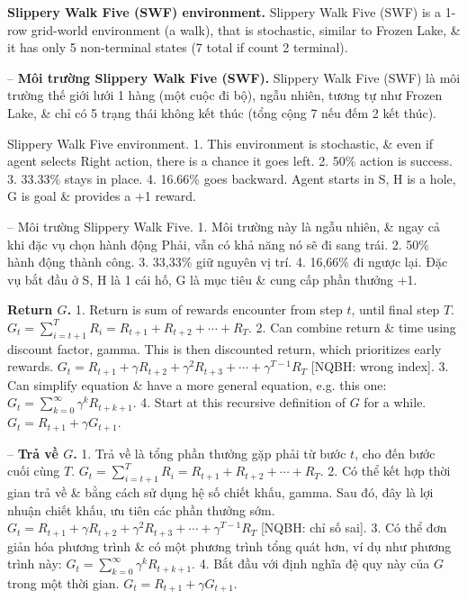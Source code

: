 \documentclass{article}
\begin{document}
\begin{itemize}
\begin{itemize}
        {\bf Slippery Walk Five (SWF) environment.} Slippery Walk Five (SWF) is a 1-row grid-world environment (a walk), that is stochastic, similar to Frozen Lake, \& it has only 5 non-terminal states (7 total if count 2 terminal).

        -- {\bf Môi trường Slippery Walk Five (SWF).} Slippery Walk Five (SWF) là môi trường thế giới lưới 1 hàng (một cuộc đi bộ), ngẫu nhiên, tương tự như Frozen Lake, \& chỉ có 5 trạng thái không kết thúc (tổng cộng 7 nếu đếm 2 kết thúc).

        {\sf Slippery Walk Five environment.} 1. This environment is stochastic, \& even if agent selects Right action, there is a chance it goes left. 2. 50\% action is success. 3. 33.33\% stays in place. 4. 16.66\% goes backward. Agent starts in S, H is a hole, G is goal \& provides a +1 reward.

        -- {\sf Môi trường Slippery Walk Five.} 1. Môi trường này là ngẫu nhiên, \& ngay cả khi đặc vụ chọn hành động Phải, vẫn có khả năng nó sẽ đi sang trái. 2. 50\% hành động thành công. 3. 33,33\% giữ nguyên vị trí. 4. 16,66\% đi ngược lại. Đặc vụ bắt đầu ở S, H là 1 cái hố, G là mục tiêu \& cung cấp phần thưởng +1.

        {\bf Return $G$.} 1. Return is sum of rewards encounter from step $t$, until final step $T$. $G_t = \sum_{i=t+1}^T R_i = R_{t+1} + R_{t+2} + \cdots + R_T$. 2. Can combine return \& time using discount factor, gamma. This is then discounted return, which prioritizes early rewards. $G_t = R_{t+1} + \gamma R_{t+2} + \gamma^2R_{t+3} + \cdots + \gamma^{T-1}R_T$ [NQBH: wrong index]. 3. Can simplify equation \& have a more general equation, e.g. this one: $G_t = \sum_{k=0}^\infty \gamma^kR_{t + k + 1}$. 4. Start at this recursive definition of $G$ for a while. $G_t = R_{t+1} + \gamma G_{t+1}$.

        -- {\bf Trả về $G$.} 1. Trả về là tổng phần thưởng gặp phải từ bước $t$, cho đến bước cuối cùng $T$. $G_t = \sum_{i=t+1}^T R_i = R_{t+1} + R_{t+2} + \cdots + R_T$. 2. Có thể kết hợp thời gian trả về \& bằng cách sử dụng hệ số chiết khấu, gamma. Sau đó, đây là lợi nhuận chiết khấu, ưu tiên các phần thưởng sớm. $G_t = R_{t+1} + \gamma R_{t+2} + \gamma^2R_{t+3} + \cdots + \gamma^{T-1}R_T$ [NQBH: chỉ số sai]. 3. Có thể đơn giản hóa phương trình \& có một phương trình tổng quát hơn, ví dụ như phương trình này: $G_t = \sum_{k=0}^\infty \gamma^kR_{t + k + 1}$. 4. Bắt đầu với định nghĩa đệ quy này của $G$ trong một thời gian. $G_t = R_{t+1} + \gamma G_{t+1}$.


\end{itemize}
\end{itemize}
\end{document}
